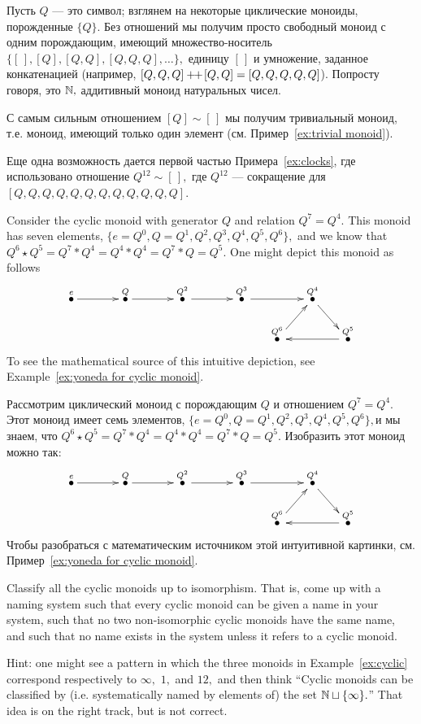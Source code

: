 \documentclass[CT4S-EN-RU]{subfiles}
\begin{document}
\begin{exampleRUS}\label{ex:cyclic}
Пусть $Q$ — это символ; взглянем на некоторые циклические моноиды, порожденные $\{Q\}.$ Без отношений мы получим просто свободный моноид с одним порождающим, имеющий множество-носитель $\{[\,],[Q],[Q,Q],[Q,Q,Q],\ldots\},$ единицу $[\,]$ и умножение, заданное конкатенацией (например, $[Q,Q,Q]+\!\!+\hspace{1pt}[Q,Q]=[Q,Q,Q,Q,Q]$). Попросту говоря, это ${\mathbb N},$ аддитивный моноид натуральных чисел.

С самым сильным отношением $[Q]\sim[\,]$ мы получим тривиальный моноид, т.е. моноид, имеющий только один элемент (см. Пример~\ref{ex:trivial monoid}).

Еще одна возможность дается первой частью Примера~\ref{ex:clocks}, где использовано отношение $Q^{12}\sim[\,],$ где $Q^{12}$ — сокращение для $[Q,Q,Q,Q,Q,Q,Q,Q,Q,Q,Q,Q].$
\end{exampleRUS}

\begin{exampleENG}\label{ex:cyclic monoid (7,4)}
Consider the cyclic monoid with generator $Q$ and relation $Q^7=Q^4.$ This monoid has seven elements, $\{e=Q^0,Q=Q^1, Q^2, Q^3, Q^4, Q^5, Q^6\},$ and we know that $Q^6\star Q^5=Q^7*Q^4=Q^4*Q^4=Q^7*Q=Q^5.$ One might depict this monoid as follows
$$\xymatrix@=15pt{
\LMO{e}\ar[rr]&&\LMO{Q}\ar[rr]&&\LMO{Q^2}\ar[rr]&&\LMO{Q^3}\ar[rr]&&\LMO{Q^4}\ar[dr]\\
&&&&&&&\LMO{Q^6}\ar[ur]&&\LMO{Q^5}\ar[ll]
}
$$
To see the mathematical source of this intuitive depiction, see Example~\ref{ex:yoneda for cyclic monoid}.
\end{exampleENG}

\begin{exampleRUS}\label{ex:cyclic monoid (7,4)}
Рассмотрим циклический моноид с порождающим $Q$ и отношением $Q^7=Q^4.$ Этот моноид имеет семь элементов, $\{e=Q^0,Q=Q^1, Q^2, Q^3, Q^4, Q^5, Q^6\},$и мы знаем, что $Q^6\star Q^5=Q^7*Q^4=Q^4*Q^4=Q^7*Q=Q^5.$ Изобразить этот моноид можно так:
$$\xymatrix@=15pt{
\LMO{e}\ar[rr]&&\LMO{Q}\ar[rr]&&\LMO{Q^2}\ar[rr]&&\LMO{Q^3}\ar[rr]&&\LMO{Q^4}\ar[dr]\\
&&&&&&&\LMO{Q^6}\ar[ur]&&\LMO{Q^5}\ar[ll]
}
$$
Чтобы разобраться с математическим источником этой интуитивной картинки, см. Пример~\ref{ex:yoneda for cyclic monoid}.
\end{exampleRUS}

\begin{exerciseENG}\label{exc:classify cyclic}
Classify all the cyclic monoids up to isomorphism. That is, come up with a naming system such that every cyclic monoid can be given a name in your system, such that no two non-isomorphic cyclic monoids have the same name, and such that no name exists in the system unless it refers to a cyclic monoid.

Hint: one might see a pattern in which the three monoids in Example~\ref{ex:cyclic} correspond respectively to $\infty,$ $1,$ and $12,$ and then think “Cyclic monoids can be classified by (i.e. systematically named by elements of) the set ${\mathbb N}\sqcup\{\infty\}.$” That idea is on the right track, but is not correct.
\end{exerciseENG}
\end{document}
